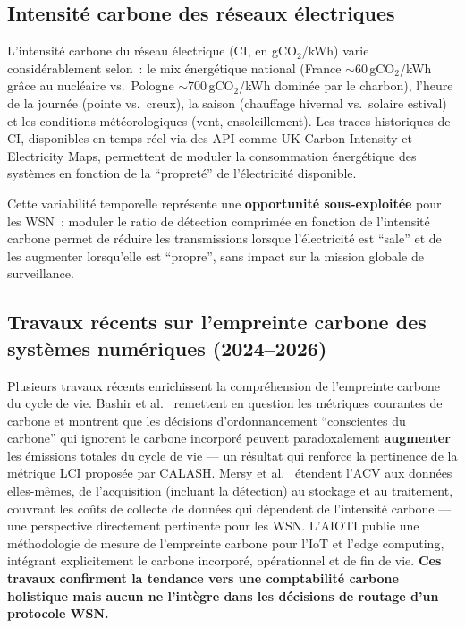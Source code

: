 \subsection{Intensité carbone des réseaux électriques}

L'intensité carbone du réseau électrique (CI, en gCO$_2$/kWh) varie considérablement selon~: le mix énergétique national (France $\sim$60\,gCO$_2$/kWh grâce au nucléaire vs.\ Pologne $\sim$700\,gCO$_2$/kWh dominée par le charbon), l'heure de la journée (pointe vs.\ creux), la saison (chauffage hivernal vs.\ solaire estival) et les conditions météorologiques (vent, ensoleillement). Les traces historiques de CI, disponibles en temps réel via des API comme UK Carbon Intensity \cite{uk_carbon_api,carbon_signals_acm2025} et Electricity Maps, permettent de moduler la consommation énergétique des systèmes en fonction de la ``propreté'' de l'électricité disponible.

Cette variabilité temporelle représente une \textbf{opportunité sous-exploitée} pour les WSN~: moduler le ratio de détection comprimée en fonction de l'intensité carbone permet de réduire les transmissions lorsque l'électricité est ``sale'' et de les augmenter lorsqu'elle est ``propre'', sans impact sur la mission globale de surveillance.

\subsection{Travaux récents sur l'empreinte carbone des systèmes numériques (2024--2026)}

Plusieurs travaux récents enrichissent la compréhension de l'empreinte carbone du cycle de vie. Bashir et al.\ \cite{bashir2024sunk} remettent en question les métriques courantes de carbone et montrent que les décisions d'ordonnancement ``conscientes du carbone'' qui ignorent le carbone incorporé peuvent paradoxalement \textbf{augmenter} les émissions totales du cycle de vie --- un résultat qui renforce la pertinence de la métrique LCI proposée par CALASH. Mersy et al.\ \cite{mersy2025lca_data} étendent l'ACV aux données elles-mêmes, de l'acquisition (incluant la détection) au stockage et au traitement, couvrant les coûts de collecte de données qui dépendent de l'intensité carbone --- une perspective directement pertinente pour les WSN. L'AIOTI \cite{aioti2024carbon} publie une méthodologie de mesure de l'empreinte carbone pour l'IoT et l'edge computing, intégrant explicitement le carbone incorporé, opérationnel et de fin de vie. \textbf{Ces travaux confirment la tendance vers une comptabilité carbone holistique mais aucun ne l'intègre dans les décisions de routage d'un protocole WSN.}

